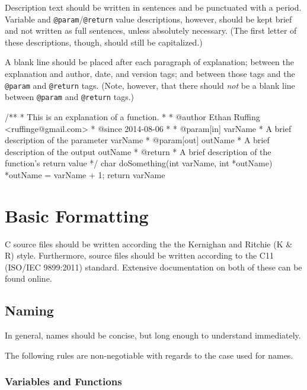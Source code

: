 \documentclass[11pt]{article}
\begin{document}
Description text should be written in sentences and be punctuated with a
period. Variable and \texttt{@param}/\texttt{@return} value
descriptions, however, should be kept brief and not written as full
sentences, unless absolutely necessary. (The first letter of these
descriptions, though, should still be capitalized.)

A blank line should be placed after each paragraph of explanation;
between the explanation and author, date, and version tags; and between
those tags and the \texttt{@param} and \texttt{@return} tags. (Note,
however, that there should \emph{not} be a blank line between
\texttt{@param} and \texttt{@return} tags.)

\begin{code}[caption=Example of Doxygen comments.,label=lst:doxygen-example]
/**
 * This is an explanation of a function.
 *
 * @author Ethan Ruffing <ruffinge@gmail.com>
 * @since 2014-08-06
 *
 * @param[in] varName
 *     A brief description of the parameter varName
 * @param[out] outName
 *     A brief description of the output outName
 * @return
 *     A brief description of the function's return value
 */
char doSomething(int varName, int *outName) {
    *outName = varName + 1;
    return varName %
}
\end{code}

\section{Basic Formatting}\label{basic-formatting}

C source files should be written according the the Kernighan and Ritchie
(K \& R) style. Furthermore, source files should be written according to
the C11 (ISO/IEC 9899:2011) standard. Extensive documentation on both of
these can be found online.

\subsection{Naming}\label{naming}

In general, names should be concise, but long enough to understand
immediately.

The following rules are non-negotiable with regards to the case used for
names.

\subsubsection{Variables and Functions}\label{variables-and-functions}
\end{document}
